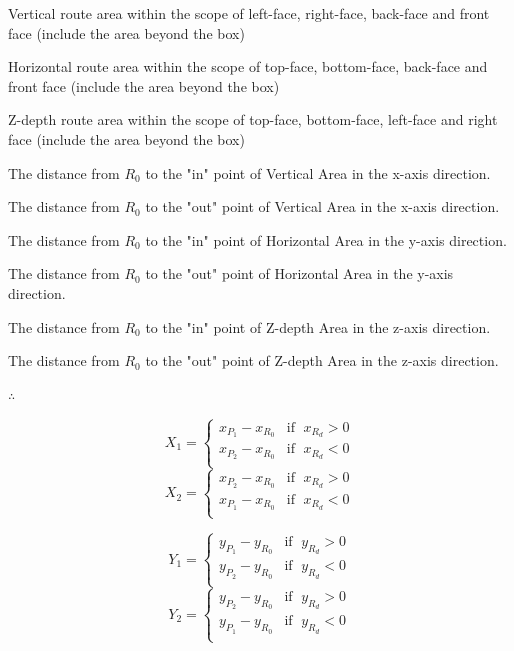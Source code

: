 \begin{description}
	\setlength{\parskip}{0pt}
	\item[$\bullet$ Vertical Area] Vertical route area within the scope of left-face, right-face, back-face and front face (include the area beyond the box)
	\item[$\bullet$ Horizontal Area] Horizontal route area within the scope of top-face, bottom-face, back-face and front face (include the area beyond the box)
	\item[$\bullet$ Z-depth Area] Z-depth route area within the scope of top-face, bottom-face, left-face and right face (include the area beyond the box)
	\item[$\bullet$ $\mathbf{X}_1$] The distance from $R_0$ to the "in" point of Vertical Area in the x-axis direction. 
	\item[$\bullet$ $\mathbf{X}_2$] The distance from $R_0$ to the "out" point of Vertical Area in the x-axis direction. 
	\item[$\bullet$ $\mathbf{Y}_1$] The distance from $R_0$ to the "in" point of Horizontal Area in the y-axis direction.
	\item[$\bullet$ $\mathbf{Y}_2$] The distance from $R_0$ to the "out" point of Horizontal Area in the y-axis direction. 
	\item[$\bullet$ $\mathbf{Z}_1$] The distance from $R_0$ to the "in" point of Z-depth Area in the z-axis direction.
	\item[$\bullet$ $\mathbf{Z}_2$] The distance from $R_0$ to the "out" point of Z-depth Area in the z-axis direction. 
\end{description}

$\therefore$

\begin{multicols}{2}
\noindent
	\[
	X_1 =
	\begin{cases}
	x_{P_1} - x_{R_0} & \text{if }\;x_{R_d} > 0\\
	x_{P_2} - x_{R_0} & \text{if }\;x_{R_d} < 0\\
	\end{cases}
	\]
\columnbreak
	\[
	X_2 =
	\begin{cases}
	x_{P_2} - x_{R_0} & \text{if }\;x_{R_d} > 0\\
	x_{P_1} - x_{R_0} & \text{if }\;x_{R_d} < 0\\
	\end{cases}
	\]
\end{multicols}

\begin{multicols}{2}
\noindent
	\[
	Y_1 =
	\begin{cases}
	y_{P_1} - y_{R_0} & \text{if }\;y_{R_d} > 0\\
	y_{P_2} - y_{R_0} & \text{if }\;y_{R_d} < 0\\
	\end{cases}
	\]
\columnbreak
	\[
	Y_2 =
	\begin{cases}
	y_{P_2} - y_{R_0} & \text{if }\;y_{R_d} > 0\\
	y_{P_1} - y_{R_0} & \text{if }\;y_{R_d} < 0\\
	\end{cases}
	\]
\end{multicols}

